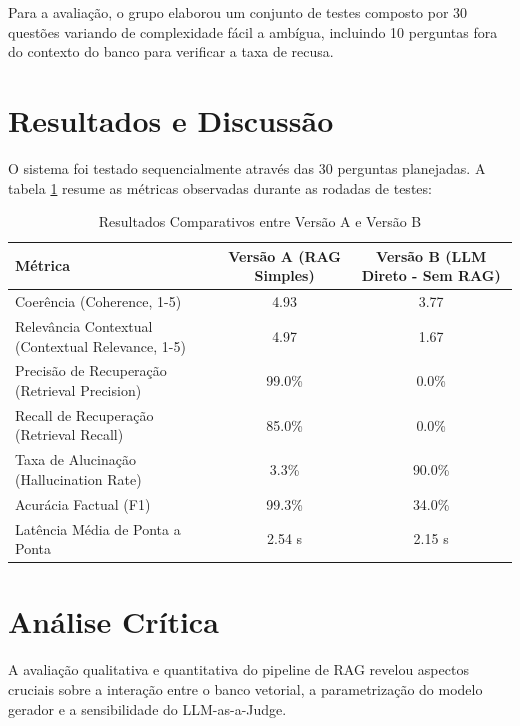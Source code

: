 \documentclass[12pt,a4paper]{article}
\begin{document}
Para a avaliação, o grupo elaborou um conjunto de testes composto por 30 questões variando de complexidade fácil a ambígua, incluindo 10 perguntas fora do contexto do banco para verificar a taxa de recusa.

\section{Resultados e Discussão}
O sistema foi testado sequencialmente através das 30 perguntas planejadas. A tabela \ref{tab:experimentos} resume as métricas observadas durante as rodadas de testes:

\begin{table}[ht]
\centering
\caption{Resultados Comparativos entre Versão A e Versão B}
\label{tab:experimentos}
\begin{tabular}{lcc}
\toprule
\textbf{Métrica} & \textbf{Versão A (RAG Simples)} & \textbf{Versão B (LLM Direto - Sem RAG)} \\
\midrule
Coerência (Coherence, 1-5) & 4.93 & 3.77 \\
Relevância Contextual (Contextual Relevance, 1-5) & 4.97 & 1.67 \\
Precisão de Recuperação (Retrieval Precision) & 99.0\% & 0.0\% \\
Recall de Recuperação (Retrieval Recall) & 85.0\% & 0.0\% \\
Taxa de Alucinação (Hallucination Rate) & 3.3\% & 90.0\% \\
Acurácia Factual (F1) & 99.3\% & 34.0\% \\
Latência Média de Ponta a Ponta & 2.54 s & 2.15 s \\
\bottomrule
\end{tabular}
\end{table}

\section{Análise Crítica}
A avaliação qualitativa e quantitativa do pipeline de RAG revelou aspectos cruciais sobre a interação entre o banco vetorial, a parametrização do modelo gerador e a sensibilidade do LLM-as-a-Judge.
\end{document}
